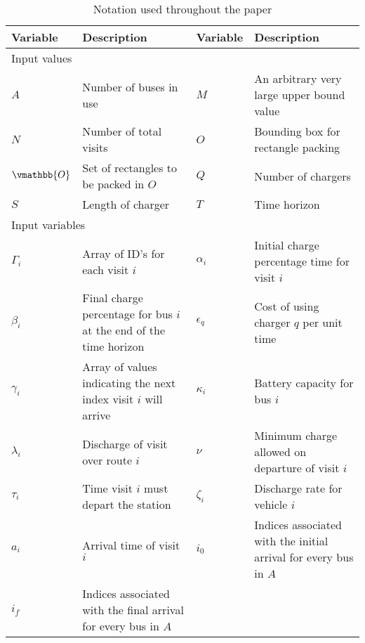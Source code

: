 \begin{table*}[!t]
	\caption{Notation used throughout the paper}
	\label{tab:variables}
	\centering
	\begin{tabular}{l l l l}
		\toprule
		\textbf{Variable} & \textbf{Description} & \textbf{Variable} & \textbf{Description} \\
		\toprule
		\multicolumn{4}{l}{Input values}                                  \\
			$A$           & Number of buses in use                    &
			$M$           & An arbitrary very large upper bound value \\
			$N$           & Number of total visits                    &
			$O$           & Bounding box for rectangle packing        \\
			$\vmathbb{O}$ & Set of rectangles to be packed in $O$     &
			$Q$           & Number of chargers                        \\
			$S$           & Length of charger                         &
			$T$           & Time horizon                              \\
		\hline
		\multicolumn{4}{l}{Input variables} \\
			$\Gamma_i$   & Array of ID's for each visit $i$                                   &
			$\alpha_i$   & Initial charge percentage time for visit $i$                       \\
			$\beta_i$    & Final charge percentage for bus $i$ at the end of the time horizon &
			$\epsilon_q$ & Cost of using charger $q$ per unit time                            \\
			$\gamma_i$   & Array of values indicating the next index visit $i$ will arrive    &
			$\kappa_i$   & Battery capacity for bus $i$                                       \\
			$\lambda_i$  & Discharge of visit over route $i$                                  &
			$\nu$        & Minimum charge allowed on departure of visit $i$                   \\
			$\tau_i$     & Time visit $i$ must depart the station                             &
			$\zeta_i$    & Discharge rate for vehicle $i$                                     \\
			$a_i$        & Arrival time of visit  $i$                                         &
			$i_0$        & Indices associated with the initial arrival for every bus in $A$   \\
			$i_f$        & Indices associated with the final arrival for every bus in $A$     &

\end{tabular}
\end{table*}
